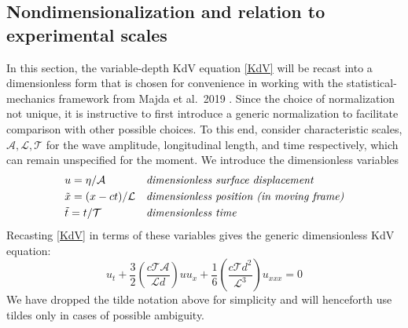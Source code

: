 \documentclass[11pt]{article}
\newcommand{\depth}{d}
\newcommand{\ampscale}{\mathcal{A}}
\newcommand{\lengthscale}{\mathcal{L}}
\newcommand{\timescale}{\mathcal{T}}
\begin{document}
\subsection{Nondimensionalization and relation to experimental scales}

In this section, the variable-depth KdV equation \eqref{KdV} will be recast into a dimensionless form that is chosen for convenience in working with the statistical-mechanics framework from Majda et al.~2019 \cite{majda2019}. Since the choice of normalization not unique, it is instructive to first introduce a generic normalization to facilitate comparison with other possible choices. To this end, consider characteristic scales, $\ampscale, \lengthscale, \timescale$ for the wave amplitude, longitudinal length, and time respectively, which can remain unspecified for the moment. We introduce the dimensionless variables
\begin{align}
&u = \eta / \ampscale
&&\mbox{\em dimensionless surface displacement} \\
&\tilde{x} = (x-ct) / \lengthscale
&&\mbox{\em dimensionless position (in moving frame)} \\
&\tilde{t} = t / \timescale
&&\mbox{\em dimensionless time}
\end{align}
Recasting \eqref{KdV} in terms of these variables gives the generic dimensionless KdV equation:
\begin{equation}
u_t + \frac{3}{2} \left( \frac{c \timescale \ampscale}{\lengthscale \depth} \right) u u_x 
+ \frac{1}{6} \left( \frac{c \timescale \depth^2}{\lengthscale^3} \right) u_{xxx} = 0
\end{equation}
We have dropped the tilde notation above for simplicity and will henceforth use tildes only in cases of possible ambiguity.
\end{document}
